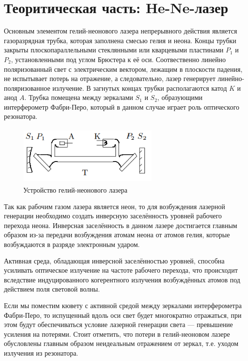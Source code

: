 \documentclass[12pt]{article}
\begin{document}
\section*{Теоритическая часть: He-Ne-лазер}
\par
	Основным элементом гелий-неонового лазера непрерывного действия является газоразрядная трубка, которая заполнена смесью гелия и неона. Концы трубки закрыты плоскопараллельными стеклянными или кварцевыми пластинами $P_1$ и $P_2$, установленными под углом Брюстера к её оси. Соотвественно линейно поляризованный свет с электрическим вектором, лежащим в плоскости падения, не испытывает потерь на отражение, а следовательно, лазер генерирует линейно-поляризованное излучение. В загнутых концах трубки располагаются катод $K$ и анод $A$. Трубка помещена между зеркалами $S_1$ и $S_2$, образующими интерферометр Фабри-Перо, который в данном случае играет роль оптического резонатора.
\begin{figure}[h!]
	\centering
	\includegraphics[width = 7cm, height = 3cm]{image1.png}
	\caption{Устройство гелий-неонового лазера}
\end{figure}
\par
	Так как рабочим газом лазера является неон, то для возбуждения лазерной генерации необходимо создать инверсную заселённость уровней рабочего перехода неона. Инверсная заселённость в данном лазере достигается главным образом из-за передачи возбуждения атомам неона от атомов гелия, которые возбуждаются  в разряде электронным ударом.
\par
	Активная среда, обладающая инверсной заселённостью уровней, способна усиливать оптическое излучение на частоте рабочего перехода, что происходит вследствие индуцированного когерентного излучения возбуждённых атомов под действием поля световой волны.
\par
	Если мы поместим кювету с активной средой между зеркалами интерферометра Фабри-Перо, то испущенный вдоль оси свет будет многократно отражаться, при этом будут обеспечиваться условие лазерной генерации света --- превышение усиления на потерями. Стоит отметить, что потери в гелий-неоновом лазере обусловлены главным образом неидеальным отражением от зеркал, т.е. уходом излучения из резонатора.
\end{document}

